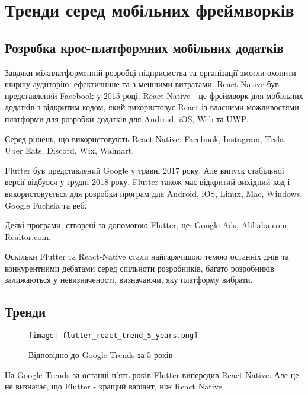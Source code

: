 \renewcommand{\proofname}{Доведення}
\renewcommand{\chaptername}{РОЗДІЛ}


\chapter{Тренди серед мобільних фреймворків}
\label{ch1}


\section{Розробка крос-платформних мобільних додатків}
\label{section.1.1}
Завдяки міжплатформенній розробці підприємства та організації змогли охопити ширшу аудиторію, ефективніше та з меншими витратами.
React Native був представлений Facebook у 2015 році.
React Native - це фреймворк для мобільних додатків з відкритим кодом, який використовує React із власними можливостями платформи для розробки додатків для Android, iOS, Web та UWP.

Серед рішень, що використовують React Native: Facebook, Instagram, Tesla, Uber Eats, Discord, Wix, Walmart.

Flutter був представлений Google у травні 2017 року. Але випуск стабільної версії відбувся у грудні 2018 року.
Flutter також має відкритий вихідний код і використовується для розробки програм для Android, iOS, Linux, Mac, Windows, Google Fuchsia та веб.

Деякі програми, створені за допомогою Flutter, це: Google Ads, Alibaba.com, Realtor.com.

Оскільки Flutter та React-Native стали найгарячішою темою останніх днів та конкурентними дебатами серед спільноти розробників, багато розробників залижаються у невизначеності, визначаючи, яку платформу вибрати.


\section{Тренди}\label{section.1.2}

\begin{figure}
    \label{fig:flutter_react_trend_5_years}
    \texttt{[image: flutter\_react\_trend\_5\_years.png]}

    Відповідно до Google Trends за 5 років
\end{figure}

На Google Trends за останні п’ять років Flutter випередив React Native.
Але це не визначає, що Flutter - кращий варіант, ніж React Native.

